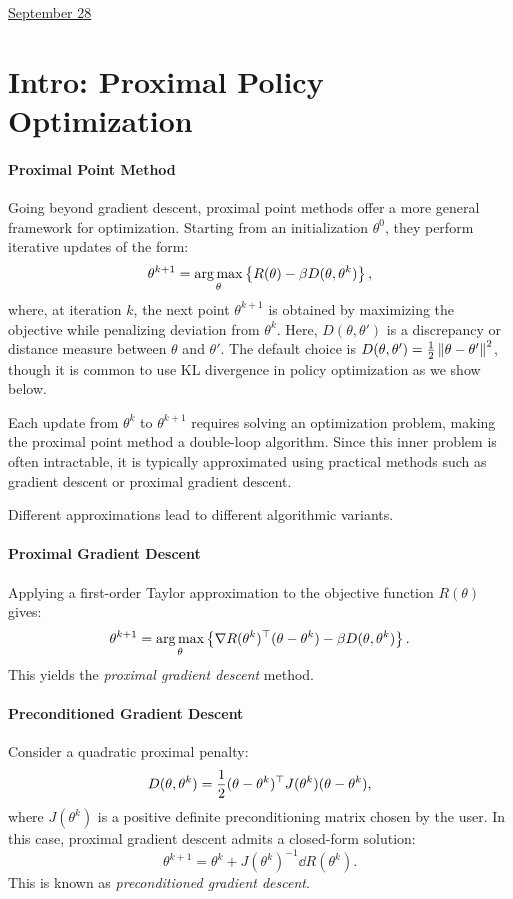 \documentclass[11pt,letterpaper]{article}
\begin{document}
\href{run:2025-09-28-2.tex}{\Huge September 28} 

\section{Intro: Proximal Policy Optimization}

\paragraph{Proximal Point Method} 
Going beyond gradient descent, proximal point methods offer a more general framework for optimization. Starting from an initialization $\theta^0$, they perform iterative updates of the form:
$$
\theta^{k+1} = \argmax_{\theta} 
  \left \{ R(\theta) - \beta D(\theta, \theta^k) \right \},
$$
where, at iteration $k$, the next point $\theta^{k+1}$ is obtained by maximizing the objective while penalizing deviation from $\theta^k$. Here, $D(\theta, \theta')$ is a discrepancy or distance measure between $\theta$ and $\theta'$. The default choice is $D(\theta, \theta') = \frac{1}{2}\norm{\theta - \theta'}^2$, though it is common to use KL divergence in policy optimization as we show below. 

Each update from $\theta^k$ to $\theta^{k+1}$ requires solving an optimization problem, making the proximal point method a double-loop algorithm. Since this inner problem is often intractable, it is typically approximated using practical methods such as gradient descent or proximal gradient descent. 

Different approximations lead to different algorithmic variants.




\paragraph{Proximal Gradient Descent} 
Applying a first-order Taylor approximation to the objective function $R(\theta)$ gives:
$$
\theta^{k+1} = \argmax_{\theta} 
  \left \{ \dd R(\theta^k) \tt (\theta - \theta^k) - \beta D(\theta, \theta^k) \right \}.
$$
This yields the \emph{proximal gradient descent} method.

\paragraph{Preconditioned Gradient Descent}
Consider a quadratic proximal penalty:
$$
D(\theta, \theta^k) = \frac{1}{2}(\theta-\theta^k)\tt J(\theta^k)(\theta - \theta^k),
$$
where $J(\theta^k)$ is a positive definite preconditioning matrix chosen by the user. In this case, proximal gradient descent admits a closed-form solution:
$$
\theta^{k+1} = \theta^k + J(\theta^k)^{-1} \dd R(\theta^k).
$$
This is known as \emph{preconditioned gradient descent}.
\end{document}

